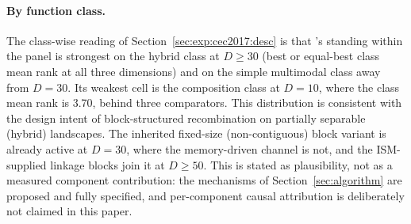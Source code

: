 \paragraph{By function class.}
The class-wise reading of
Section~\ref{sec:exp:cec2017:desc} is that \dtgsk{}'s standing
within the panel is strongest on the hybrid class at $D \geq 30$
(best or equal-best class mean rank at all three dimensions) and on
the simple multimodal class away from $D = 30$. Its weakest cell is the
composition class at $D = 10$, where the class mean rank is 3.70, behind
three comparators.
This distribution is consistent with the design intent of
block-structured recombination on partially separable (hybrid)
landscapes. The inherited fixed-size (non-contiguous) block variant is
already active at $D = 30$, where the memory-driven channel is not, and the
ISM-supplied linkage blocks join it at $D \geq 50$. This is stated as
plausibility, not as a measured component contribution: the
mechanisms of
Section~\ref{sec:algorithm} are proposed
and fully specified, and per-component causal attribution is
deliberately not claimed in this paper.

